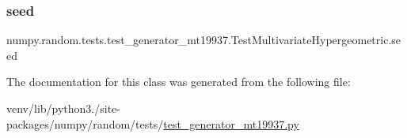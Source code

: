 \subsubsection{\texorpdfstring{seed}{seed}}
{\footnotesize\ttfamily numpy.\+random.\+tests.\+test\+\_\+generator\+\_\+mt19937.\+Test\+Multivariate\+Hypergeometric.\+seed}



The documentation for this class was generated from the following file\+:\begin{DoxyCompactItemize}
\item 
venv/lib/python3./site-\/packages/numpy/random/tests/\hyperlink{test__generator__mt19937_8py}{test\+\_\+generator\+\_\+mt19937.\+py}\end{DoxyCompactItemize}
